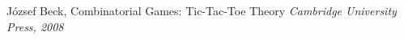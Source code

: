 \begin{thebibliography}{9}


József Beck, Combinatorial Games: Tic-Tac-Toe Theory
\emph{Cambridge University Press, 2008}

\end{thebibliography}
